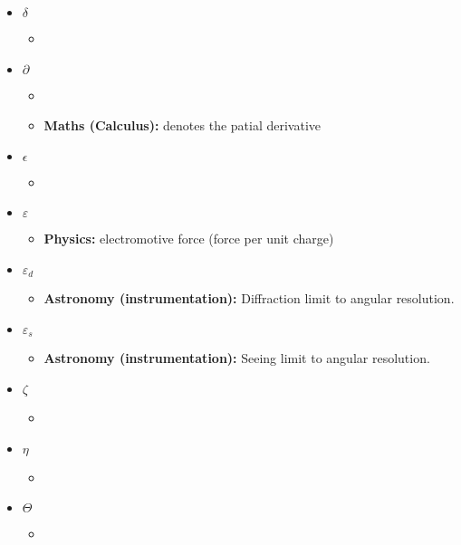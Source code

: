 \begin{itemize}
				\item $\delta$
				\begin{itemize}
					\item 
				\end{itemize}
				
				\item $\partial$
				\begin{itemize}
					\item \item\textbf{Maths (Calculus):} denotes the patial derivative
				\end{itemize}
								
				\item $\epsilon$
				\begin{itemize}
					\item 
				\end{itemize}	
								
				\item $\varepsilon$
				\begin{itemize}
					\item \textbf{Physics:} electromotive force (force per unit charge)
				\end{itemize}
				
				\item $\varepsilon_d$
				\begin{itemize}
					\item \textbf{Astronomy (instrumentation):} Diffraction limit to angular resolution.
				\end{itemize}
				
				\item $\varepsilon_s$
				\begin{itemize}
					\item \textbf{Astronomy (instrumentation):} Seeing limit to angular resolution.
				\end{itemize}
				
				\item $\zeta$
				\begin{itemize}
					\item 
				\end{itemize}
				
				\item $\eta$
				\begin{itemize}
					\item 
				\end{itemize}
				
				\item $\Theta$
				\begin{itemize}
					\item 
				\end{itemize}
				

\end{itemize}
